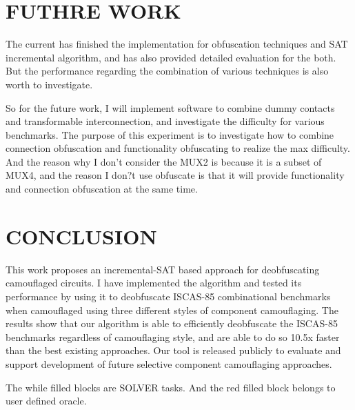 \documentclass[proposal]{umassthesis}  %
\begin{document}

\chapter{FUTHRE WORK}
The current has finished the implementation for obfuscation techniques and SAT incremental algorithm, and has also provided detailed evaluation for the both. But the performance regarding the combination of various techniques is also worth to investigate. 

So for the future work, I will implement software to combine dummy contacts and transformable interconnection, and investigate the difficulty for various benchmarks. The purpose of this experiment is to investigate how to combine connection obfuscation and functionality obfuscating to realize the max difficulty. And the reason why I don't consider the MUX2 is because it is a subset of MUX4, and the reason I don?t use obfuscate is that it will provide functionality and connection obfuscation at the same time.

\chapter{CONCLUSION}

This work proposes an incremental-SAT based approach for deobfuscating camouflaged circuits. I have implemented the algorithm and tested its performance by using it to deobfuscate ISCAS-85 combinational benchmarks when camouflaged using three different styles of component camouflaging. The results show that our algorithm is able to efficiently deobfuscate the ISCAS-85 benchmarks regardless of camouflaging style, and are able to do so 10.5x faster than the best existing approaches. Our tool is released publicly to evaluate and support development of future selective component camouflaging approaches. 


The while filled blocks are SOLVER tasks. And the red filled block belongs to user defined oracle. 


\backmatter  %




\end{document}
